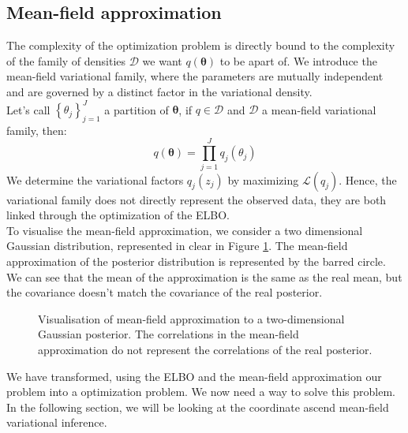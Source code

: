 \documentclass{article}
\begin{document}
\subsection{Mean-field approximation}
The complexity of the optimization problem is directly bound to the complexity of the family of densities $\mathcal{D}$ we want $q(\boldsymbol{\theta})$ to be apart of. We introduce the mean-field variational family, where the parameters are mutually independent and are governed by a distinct factor in the variational density.\\
\newline
Let's call $\left\lbrace \theta_j\right\rbrace_{j=1}^J$ a partition of $\boldsymbol{\theta}$, if $q \in \mathcal{D}$ and $\mathcal{D}$ a mean-field variational family, then:
\begin{equation*}
q(\boldsymbol{\theta}) = \prod_{j=1}^J q_j(\theta_j)
\end{equation*}
We determine the variational factors $q_j(z_j)$ by maximizing $\mathcal{L}(q_j)$. Hence, the variational family does not directly represent the observed data, they are both linked through the optimization of the \small{ELBO}.\\
\newline
%
To visualise the mean-field approximation, we consider a two dimensional Gaussian distribution, represented in clear in Figure \ref{fig:mean_field}. The mean-field approximation of the posterior distribution is represented by the barred circle. We can see that the mean of the approximation is the same as the real mean, but the covariance doesn't match the covariance of the real posterior.\\
\newline
%
\begin{figure}[h!]
\centering
{}
\caption{\label{fig:mean_field}Visualisation of mean-field approximation to a two-dimensional Gaussian posterior. The correlations in the mean-field approximation do not represent the correlations of the real posterior.}
\end{figure}
%
We have transformed, using the \small{ELBO} and the mean-field approximation our problem into a optimization problem. We now need a way to solve this problem. In the following section, we will be looking at the coordinate ascend mean-field variational inference.
\end{document}
